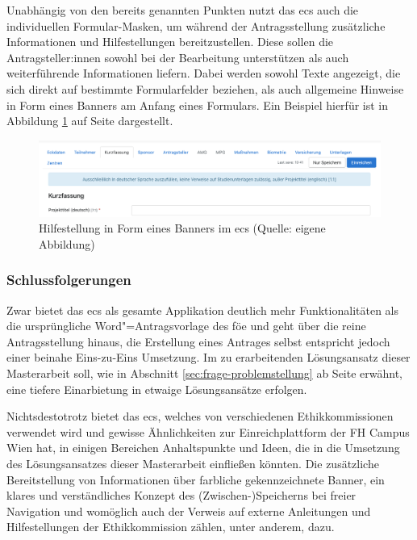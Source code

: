 \documentclass[a4paper,12pt,twoside]{scrreprt}
\begin{document}
\medskip

Unabhängig von den bereits genannten Punkten nutzt das \ac{ecs} auch die individuellen Formular-Masken, um während der Antragsstellung zusätzliche Informationen und Hilfestellungen bereitzustellen. Diese sollen die Antragsteller:innen sowohl bei der Bearbeitung unterstützen als auch weiterführende Informationen liefern. Dabei werden sowohl Texte angezeigt, die sich direkt auf bestimmte Formularfelder beziehen, als auch allgemeine Hinweise in Form eines Banners am Anfang eines Formulars. Ein Beispiel hierfür ist in Abbildung \ref{fig:ecs-banner-hilfestellung} auf Seite \pageref{fig:ecs-banner-hilfestellung} dargestellt.

\begin{figure}[ht]
    \centering
    \includegraphics[width=\linewidth]{thesis/images/Luidold_ECS-Banner-Hilfestellung.png}
    \caption[Hilfestellung in Form eines Banners im \acl{ecs}]{Hilfestellung in Form eines Banners im \acl{ecs} (Quelle: eigene Abbildung)}
    \label{fig:ecs-banner-hilfestellung}
\end{figure}

\subsubsection*{Schlussfolgerungen}
\label{sub-sub-sec:schlussfolgerungen-ecs}

Zwar bietet das \acl{ecs} als gesamte Applikation deutlich mehr Funktionalitäten als die ursprüngliche Word"=Antragsvorlage des \ac{föe} und geht über die reine Antragsstellung hinaus, die Erstellung eines Antrages selbst entspricht jedoch einer beinahe Eins-zu-Eins Umsetzung. Im zu erarbeitenden Lösungsansatz dieser Masterarbeit soll, wie in Abschnitt \ref{sec:frage-problemstellung} ab Seite \pageref{sec:frage-problemstellung} erwähnt, eine tiefere Einarbietung in etwaige Lösungsansätze erfolgen.

Nichtsdestotrotz bietet das \ac{ecs}, welches von verschiedenen Ethikkommissionen verwendet wird und gewisse Ähnlichkeiten zur Einreichplattform der FH Campus Wien hat, in einigen Bereichen Anhaltspunkte und Ideen, die in die Umsetzung des Lösungsansatzes dieser Masterarbeit einfließen könnten. Die zusätzliche Bereitstellung von Informationen über farbliche gekennzeichnete Banner, ein klares und verständliches Konzept des (Zwischen-)Speicherns bei freier Navigation und womöglich auch der Verweis auf externe Anleitungen und Hilfestellungen der Ethikkommission zählen, unter anderem, dazu.
\end{document}

